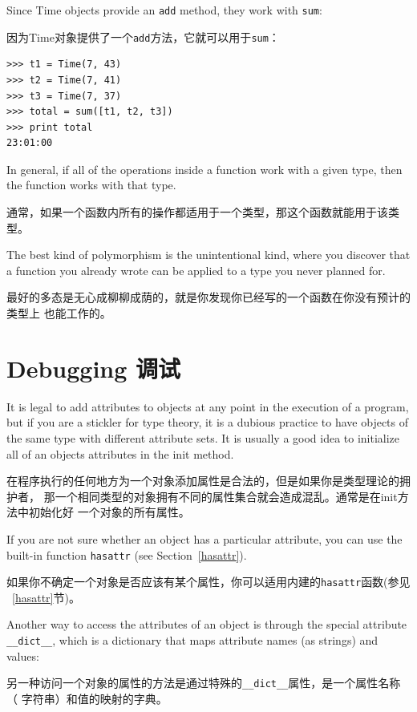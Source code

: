 \documentclass[10pt]{book}
\begin{document}
\begin{CJK}{UTF8}{gbsn}
Since Time objects provide an {\tt add} method, they work
with {\tt sum}:

因为Time对象提供了一个{\tt add}方法，它就可以用于{\tt sum}：

\begin{verbatim}
>>> t1 = Time(7, 43)
>>> t2 = Time(7, 41)
>>> t3 = Time(7, 37)
>>> total = sum([t1, t2, t3])
>>> print total
23:01:00
\end{verbatim}
%
In general, if all of the operations inside a function 
work with a given type, then the function works with that type.

通常，如果一个函数内所有的操作都适用于一个类型，那这个函数就能用于该类型。

The best kind of polymorphism is the unintentional kind, where
you discover that a function you already wrote can be
applied to a type you never planned for.

最好的多态是无心成柳柳成荫的，就是你发现你已经写的一个函数在你没有预计的类型上
也能工作的。


\section{Debugging 调试}

It is legal to add attributes to objects at any point in the execution
of a program, but if you are a stickler for type theory, it is a
dubious practice to have objects of the same type with different
attribute sets.  It is usually a good idea to
initialize all of an objects attributes in the init method.

在程序执行的任何地方为一个对象添加属性是合法的，但是如果你是类型理论的拥护者，
那一个相同类型的对象拥有不同的属性集合就会造成混乱。通常是在init方法中初始化好
一个对象的所有属性。

If you are not sure whether an object has a particular attribute, you
can use the built-in function {\tt hasattr} (see Section~\ref{hasattr}).

如果你不确定一个对象是否应该有某个属性，你可以适用内建的{\tt hasattr}函数(参见
~\ref{hasattr}节)。

Another way to access the attributes of an object is through the
special attribute \verb"__dict__", which is a dictionary that maps
attribute names (as strings) and values:

另一种访问一个对象的属性的方法是通过特殊的\verb"__dict__"属性，是一个属性名称（
字符串）和值的映射的字典。


\end{CJK}
\end{document}
